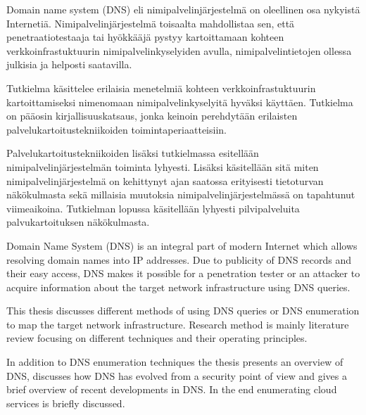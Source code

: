 %
%

\begin{fiabstract}
Domain name system (DNS) eli nimipalvelinjärjestelmä on oleellinen osa nykyistä Internetiä. Nimipalvelinjärjestelmä toisaalta mahdollistaa sen, että penetraatiotestaaja tai hyökkääjä pystyy kartoittamaan kohteen verkkoinfrastuktuurin nimipalvelinkyselyiden avulla, nimipalvelintietojen ollessa julkisia ja helposti saatavilla. 

Tutkielma käsittelee erilaisia menetelmiä kohteen verkkoinfrastuktuurin kartoittamiseksi nimenomaan nimipalvelinkyselyitä hyväksi käyttäen. Tutkielma on pääosin kirjallisuuskatsaus, jonka keinoin perehdytään erilaisten palvelukartoitustekniikoiden toimintaperiaatteisiin.

Palvelukartoitustekniikoiden lisäksi tutkielmassa esitellään nimipalvelinjärjestelmän toiminta lyhyesti. Lisäksi käsitellään sitä miten nimipalvelinjärjestelmä on kehittynyt ajan saatossa erityisesti tietoturvan näkökulmasta sekä millaisia muutoksia nimipalvelinjärjestelmässä on tapahtunut viimeaikoina. Tutkielman lopussa käsitellään lyhyesti pilvipalveluita palvukartoituksen näkökulmasta.

%
\end{fiabstract}


\begin{enabstract}
Domain Name System (DNS) is an integral part of modern Internet which allows resolving domain names into IP addresses. Due to publicity of DNS records and their easy access, DNS makes it possible for a penetration tester or an attacker to acquire information about the target network infrastructure using DNS queries.

This thesis discusses different methods of using DNS queries or DNS enumeration to map the target network infrastructure. Research method is mainly literature review focusing on different techniques and their operating principles. 

In addition to DNS enumeration techniques the thesis presents an overview of DNS, discusses how DNS has evolved from a security point of view and gives a brief overview of recent developments in DNS. In the end enumerating cloud services is briefly discussed.
\end{enabstract}
